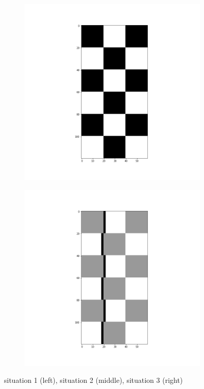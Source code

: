 \documentclass[a4paper,12pt,twoside]{article}
\begin{document}
\begin{figure}[!h]
\begin{subfigure}[b]{0.3\textwidth}
			 		\includegraphics[scale=0.2]{situation2.png}
			 	\end{subfigure}
			 	\begin{subfigure}[b]{0.3\textwidth}
			 		\includegraphics[scale=0.2]{situation3.png}
			 	\end{subfigure}
			 	\caption{situation 1 (left), situation 2 (middle), situation 3 (right)}
			 	\label{flawed detailed balance}			
	 \end{figure}
	 
\end{document}
